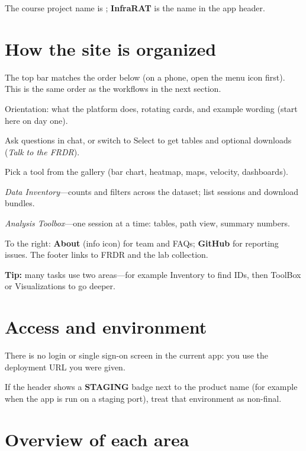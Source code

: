 \documentclass{article}
\begin{document}
The course project name is \progname{}; \textbf{InfraRAT} is the name in the app header.

\section{How the site is organized}
\label{sec:map}

The top bar matches the order below (on a phone, open the menu icon first). This is the same order as the workflows in the next section.

\begin{description}[style=nextline, font=\normalfont\bfseries]
  \item[Home] Orientation: what the platform does, rotating cards, and example wording (start here on day one).
  \item[Query] Ask questions in chat, or switch to Select to get tables and optional downloads (\emph{Talk to the FRDR}).
  \item[Visualizations] Pick a tool from the gallery (bar chart, heatmap, maps, velocity, dashboards).
  \item[Inventory] \emph{Data Inventory}---counts and filters across the dataset; list sessions and download bundles.
  \item[ToolBox] \emph{Analysis Toolbox}---one session at a time: tables, path view, summary numbers.
\end{description}

To the right: \textbf{About} (info icon) for team and FAQs; \textbf{GitHub} for reporting issues. The footer links to FRDR and the lab collection.

\textbf{Tip:} many tasks use two areas---for example Inventory to find IDs, then ToolBox or Visualizations to go deeper.

\section{Access and environment}
\label{sec:before}

There is no login or single sign-on screen in the current app: you use the deployment URL you were given.

If the header shows a \textbf{STAGING} badge next to the product name (for example when the app is run on a staging port), treat that environment as non-final.

\section{Overview of each area}
\label{sec:area-overview}
\end{document}
